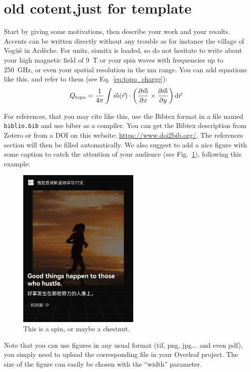 \documentclass[a4paper, 10pt]{article}
\begin{document}
\section{old cotent,just for template}
Start by giving some motivations, then describe your work and your results. Accents can be written directly without any trouble as for instance the village of Vogüé in Ardèche. For units, siunitx is loaded, so do not hesitate to write about your high magnetic field of \SI{9}{\tesla} or your spin waves with frequencies up to \SI{250}{\GHz}, or even your spatial resolution in the \si{\nano\meter} range. You can add equations like this, and refer to them (see Eq.~\ref{eq:topo_charge}):
\begin{equation}
	\label{eq:topo_charge}
	Q_\text{topo} = \frac{1}{4\pi} \int \vec{m}(\vec{r}) \cdot \left (\pdv{\vec{m}}{x} \times \pdv{\vec{m}}{y} \right) \dd{\vec{r}}
\end{equation}

For references, that you may cite like this\cite{wolfSpintronicsSpinBasedElectronics2001}, use the Bibtex format in a file named \texttt{biblio.bib} and use biber as a compiler. You can get the Bibtex description from Zotero or from a DOI on this website: \url{https://www.doi2bib.org/}.  The references section will then be filled automatically. We also suggest to add a nice figure with some caption to catch the attention of your audience (see Fig.~\ref{fig:spin}), following this example:
\begin{figure}[ht]
	\centering
	\includegraphics[width=6cm]{111.jpg}
	\caption{This is a spin, or maybe a chestnut.}
	\label{fig:spin}
\end{figure}

Note that you can use figures in any usual format (tif, png, jpg... and even pdf), you simply need to upload the corresponding file in your Overleaf project. The size of the figure can easily be chosen with the ``width'' parameter.
\end{document}
